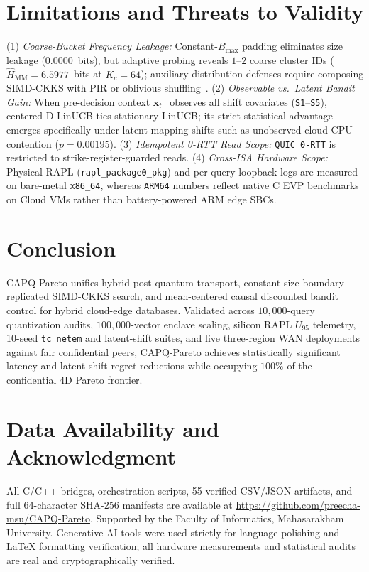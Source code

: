 \documentclass[10pt,journal,compsoc]{IEEEtran}
\begin{document}
\section{Limitations and Threats to Validity}\label{sec:limitations}
(1) \emph{Coarse-Bucket Frequency Leakage:} Constant-$B_{\max}$ padding eliminates size leakage ($0.0000$~bits), but adaptive probing reveals $1$--$2$ coarse cluster IDs ($\hat{H}_{\mathrm{MM}}=6.5977$~bits at $K_c=64$); auxiliary-distribution defenses require composing SIMD-CKKS with PIR or oblivious shuffling~\cite{chen2020sanns, henzinger2023tiptoe}. (2) \emph{Observable vs.\ Latent Bandit Gain:} When pre-decision context $\mathbf{x}_{t^-}$ observes all shift covariates (\texttt{S1}--\texttt{S5}), centered D-LinUCB ties stationary LinUCB; its strict statistical advantage emerges specifically under latent mapping shifts such as unobserved cloud CPU contention ($p=0.00195$). (3) \emph{Idempotent 0-RTT Read Scope:} \texttt{QUIC 0-RTT} is restricted to strike-register-guarded reads. (4) \emph{Cross-ISA Hardware Scope:} Physical RAPL (\texttt{rapl\_package0\_pkg}) and per-query loopback logs are measured on bare-metal \texttt{x86\_64}, whereas \texttt{ARM64} numbers reflect native C EVP benchmarks on Cloud VMs rather than battery-powered ARM edge SBCs.

\section{Conclusion}\label{sec:conclusion}
CAPQ-Pareto unifies hybrid post-quantum transport, constant-size boundary-replicated SIMD-CKKS search, and mean-centered causal discounted bandit control for hybrid cloud-edge databases. Validated across $10{,}000$-query quantization audits, $100{,}000$-vector enclave scaling, silicon RAPL $U_{95}$ telemetry, 10-seed \texttt{tc netem} and latent-shift suites, and live three-region WAN deployments against fair confidential peers, CAPQ-Pareto achieves statistically significant latency and latent-shift regret reductions while occupying $100\%$ of the confidential 4D Pareto frontier.

\section*{Data Availability and Acknowledgment}
All C/C++ bridges, orchestration scripts, 55 verified CSV/JSON artifacts, and full 64-character SHA-256 manifests are available at \url{https://github.com/preecha-msu/CAPQ-Pareto}. Supported by the Faculty of Informatics, Mahasarakham University. Generative AI tools were used strictly for language polishing and \LaTeX{} formatting verification; all hardware measurements and statistical audits are real and cryptographically verified.
\end{document}
